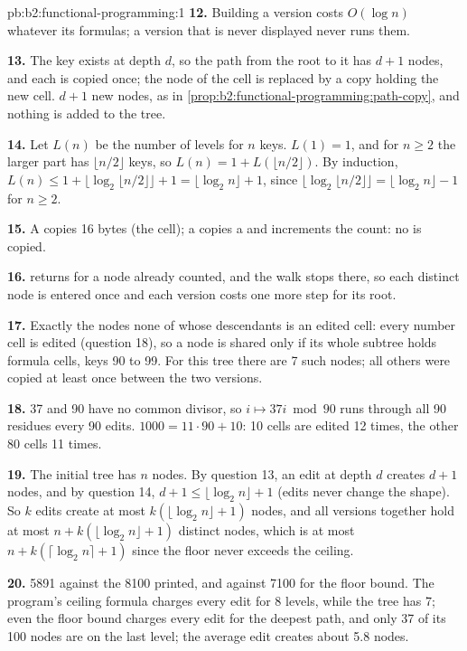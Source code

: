 \begin{solution}{pb:b2:functional-programming:1}
\textbf{12.} Building a version costs $O(\log n)$ whatever its formulas; a version that is never displayed never runs
them.

\textbf{13.} The key exists at depth $d$, so the path from the root to it has $d + 1$ nodes, and each is copied once;
the node of the cell is replaced by a copy holding the new cell. $d + 1$ new nodes, as in
\cref{prop:b2:functional-programming:path-copy}, and nothing is added to the tree.

\textbf{14.} Let $L(n)$ be the number of levels for $n$ keys. $L(1) = 1$, and for $n \ge 2$ the larger part has
$\lfloor n/2 \rfloor$ keys, so $L(n) = 1 + L(\lfloor n/2 \rfloor)$. By induction, $L(n) \le 1 + \lfloor \log_2 \lfloor
n/2 \rfloor \rfloor + 1 = \lfloor \log_2 n \rfloor + 1$, since $\lfloor \log_2 \lfloor n/2 \rfloor \rfloor =
\lfloor \log_2 n \rfloor - 1$ for $n \ge 2$.

\textbf{15.} A  copies 16 bytes (the cell); a  copies a  and increments the
 count: no  is copied.

\textbf{16.}  returns  for a node already counted, and the walk stops there, so each
distinct node is entered once and each version costs one more step for its root.

\textbf{17.} Exactly the nodes none of whose descendants is an edited cell: every number cell is edited (question
18), so a node is shared only if its whole subtree holds formula cells, keys 90 to 99. For this tree there are 7 such
nodes; all others were copied at least once between the two versions.

\textbf{18.} 37 and 90 have no common divisor, so $i \mapsto 37i \bmod 90$ runs through all 90 residues every 90
edits. $1000 = 11 \cdot 90 + 10$: 10 cells are edited 12 times, the other 80 cells 11 times.

\textbf{19.} The initial tree has $n$ nodes. By question 13, an edit at depth $d$ creates $d + 1$ nodes, and by
question 14, $d + 1 \le \lfloor \log_2 n \rfloor + 1$ (edits never change the shape). So $k$ edits create at most
$k(\lfloor \log_2 n \rfloor + 1)$ nodes, and all versions together hold at most $n + k(\lfloor \log_2 n \rfloor + 1)$
distinct nodes, which is at most $n + k(\lceil \log_2 n \rceil + 1)$ since the floor never exceeds the ceiling.

\textbf{20.} 5891 against the 8100 printed, and against 7100 for the floor bound. The program's ceiling formula charges
every edit for 8 levels, while the tree has 7; even the floor bound charges every edit for the deepest path, and only 37 of its 100 nodes are on the last level; the average edit creates about
5.8 nodes.


\end{solution}
